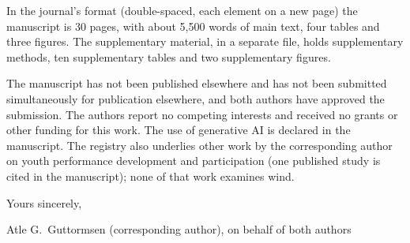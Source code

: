 \documentclass[11pt,a4paper]{article}
\begin{document}
In the journal's format (double-spaced, each element on a new page) the manuscript is 30 pages, with about 5,500 words of main text, four tables and three figures. The supplementary material, in a separate file, holds supplementary methods, ten supplementary tables and two supplementary figures.

The manuscript has not been published elsewhere and has not been submitted simultaneously for publication elsewhere, and both authors have approved the submission. The authors report no competing interests and received no grants or other funding for this work. The use of generative AI is declared in the manuscript. The registry also underlies other work by the corresponding author on youth performance development and participation (one published study is cited in the manuscript); none of that work examines wind.

Yours sincerely,

\medskip
Atle G.\ Guttormsen (corresponding author), on behalf of both authors
\end{document}
